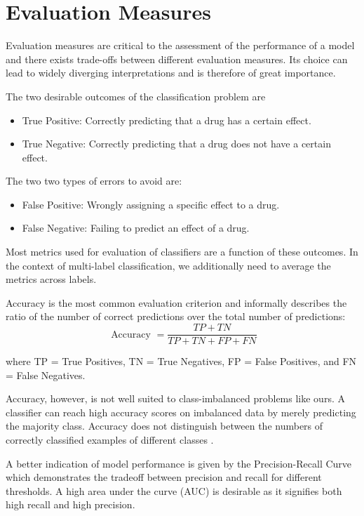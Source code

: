 \documentclass[bsc,frontabs,twoside,singlespacing,parskip,deptreport]{infthesis}     %
\let\Oldsection\section
\renewcommand{\section}{\FloatBarrier\Oldsection}
\begin{document}
\section{Evaluation Measures}
Evaluation measures are critical to the assessment of the performance of a model and there exists trade-offs between different evaluation measures. Its choice can lead to widely diverging interpretations and is therefore of great importance.

The two desirable outcomes of the classification problem are 
\begin{itemize}
    \item True Positive: Correctly predicting that a drug has a certain effect.
    \item True Negative: Correctly predicting that a drug does not have a certain effect.
\end{itemize}

The two two types of errors to avoid are:
\begin{itemize}
    \item False Positive: Wrongly assigning a specific effect to a drug.
    \item False Negative: Failing to predict an effect of a drug.
\end{itemize}

Most metrics used for evaluation of classifiers are a function of these outcomes. In the context of multi-label classification, we additionally need to average the metrics across labels.

Accuracy is the most common evaluation criterion and informally describes the ratio of the number of correct predictions over the total number of predictions:
\[\text { Accuracy }=\frac{T P+T N}{T P+T N+F P+F N}\]

where TP = True Positives, TN = True Negatives, FP = False Positives, and FN = False Negatives.

Accuracy, however, is not well suited to class-imbalanced problems like ours. A classifier can reach high accuracy scores on imbalanced data by merely predicting the majority class. Accuracy does not distinguish between the numbers of correctly classified examples of different classes \cite{galar_review_2012}.

A better indication of model performance is given by the Precision-Recall Curve which demonstrates the tradeoff between precision and recall for different thresholds. A high area under the curve (AUC) is desirable as it signifies both high recall and high precision.
\end{document}
